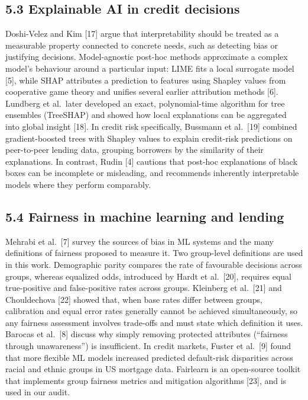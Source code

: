 \documentclass[
  11pt,
]{article}
\begin{document}
\hypertarget{explainable-ai-in-credit-decisions}{%
\subsection{5.3 Explainable AI in credit
decisions}\label{explainable-ai-in-credit-decisions}}

Doshi-Velez and Kim {[}17{]} argue that interpretability should be
treated as a measurable property connected to concrete needs, such as
detecting bias or justifying decisions. Model-agnostic post-hoc methods
approximate a complex model's behaviour around a particular input: LIME
fits a local surrogate model {[}5{]}, while SHAP attributes a prediction
to features using Shapley values from cooperative game theory and
unifies several earlier attribution methods {[}6{]}. Lundberg et
al.~later developed an exact, polynomial-time algorithm for tree
ensembles (TreeSHAP) and showed how local explanations can be aggregated
into global insight {[}18{]}. In credit risk specifically, Bussmann et
al.~{[}19{]} combined gradient-boosted trees with Shapley values to
explain credit-risk predictions on peer-to-peer lending data, grouping
borrowers by the similarity of their explanations. In contrast, Rudin
{[}4{]} cautions that post-hoc explanations of black boxes can be
incomplete or misleading, and recommends inherently interpretable models
where they perform comparably.

\hypertarget{fairness-in-machine-learning-and-lending}{%
\subsection{5.4 Fairness in machine learning and
lending}\label{fairness-in-machine-learning-and-lending}}

Mehrabi et al.~{[}7{]} survey the sources of bias in ML systems and the
many definitions of fairness proposed to measure it. Two group-level
definitions are used in this work. Demographic parity compares the rate
of favourable decisions across groups, whereas equalized odds,
introduced by Hardt et al.~{[}20{]}, requires equal true-positive and
false-positive rates across groups. Kleinberg et al.~{[}21{]} and
Chouldechova {[}22{]} showed that, when base rates differ between
groups, calibration and equal error rates generally cannot be achieved
simultaneously, so any fairness assessment involves trade-offs and must
state which definition it uses. Barocas et al.~{[}8{]} discuss why
simply removing protected attributes (``fairness through unawareness'')
is insufficient. In credit markets, Fuster et al.~{[}9{]} found that
more flexible ML models increased predicted default-risk disparities
across racial and ethnic groups in US mortgage data. Fairlearn is an
open-source toolkit that implements group fairness metrics and
mitigation algorithms {[}23{]}, and is used in our audit.
\end{document}

